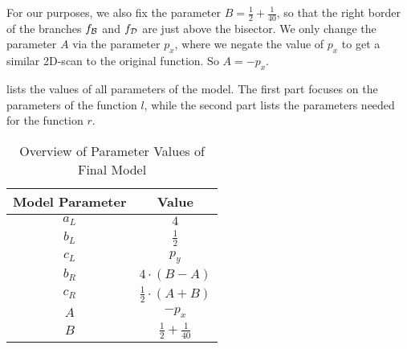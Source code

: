 For our purposes, we also fix the parameter $B = \frac{1}{2} + \frac{1}{40}$, so that the right border of the branches $f_{\mathcal{B}}$ and $f_{\mathcal{D}}$ are just above the bisector.
We only change the parameter $A$ via the parameter $p_x$, where we negate the value of $p_x$ to get a similar 2D-scan to the original function.
So $A = -p_x$.

 lists the values of all parameters of the model.
The first part focuses on the parameters of the function $l$, while the second part lists the parameters needed for the function $r$.

\begin{table}
	\centering
	\begin{tabular}{|c|c|}
		\hline
		Model Parameter & Value                        \\ \hline \hline
		$a_L$           & $4$                          \\ \hline
		$b_L$           & $\frac{1}{2}$                \\ \hline
		$c_L$           & $p_y$                        \\ \hline \hline
		$b_R$           & $4 \cdot (B - A)$            \\ \hline
		$c_R$           & $\frac{1}{2} \cdot (A + B)$  \\ \hline
		$A$             & $-p_x$                       \\ \hline
		$B$             & $\frac{1}{2} + \frac{1}{40}$ \\ \hline
	\end{tabular}
	\caption{Overview of Parameter Values of Final Model}
	\label{tab:final.def.parameters.overview}
\end{table}
